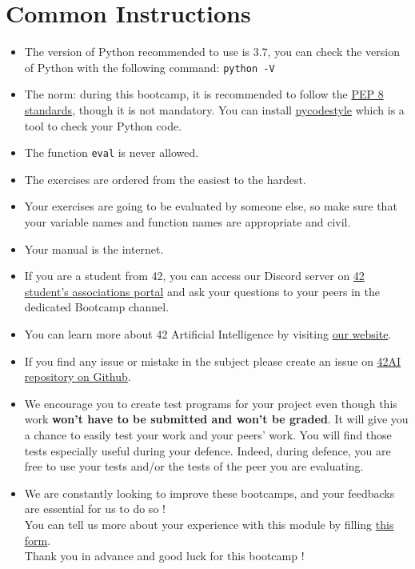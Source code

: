 \chapter{Common Instructions}
\begin{itemize}
  \item The version of Python recommended to use is 3.7, you can
  check the version of Python with the following command: \texttt{python -V}
  
  \item The norm: during this bootcamp, it is recommended to follow the
  \href{https://www.python.org/dev/peps/pep-0008/}{PEP 8 standards}, though it is not mandatory.
  You can install \href{https://pypi.org/project/pycodestyle}{pycodestyle} which
  is a tool to check your Python code.
  \item The function \texttt{eval} is never allowed.
  \item The exercises are ordered from the easiest to the hardest.
  \item Your exercises are going to be evaluated by someone else,
  so make sure that your variable names and function names are appropriate and civil.
  \item Your manual is the internet.
  
  \item If you are a student from 42, you can access our Discord server 
  on \href{https://discord.com/channels/887850395697807362/887850396314398720}{42 student's associations portal} and ask your
  questions to your peers in the dedicated Bootcamp channel. 

  \item You can learn more about 42 Artificial Intelligence by visiting \href{https://42-ai.github.io}{our website}.

  \item If you find any issue or mistake in the subject please create an issue on \href{https://github.com/42-AI/bootcamp_python/issues}{42AI repository on Github}.
  
  \item We encourage you to create test programs for your
  project even though this work \textbf{won't have to be
  submitted and won't be graded}. It will give you a chance
  to easily test your work and your peers’ work. You will find
  those tests especially useful during your defence. Indeed,
  during defence, you are free to use your tests and/or the
  tests of the peer you are evaluating.

  \item We are constantly looking to improve these bootcamps, and your feedbacks are essential for us to do so !\\
  You can tell us more about your experience with this module by filling \href{https://forms.gle/xbm2VjynZq8BfpbM6}{this form}.\\
  Thank you in advance and good luck for this bootcamp !

\end{itemize}